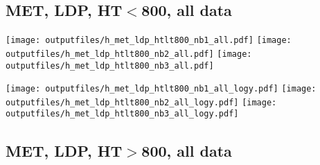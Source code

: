 \documentclass[11pt]{article}
\begin{document}







    \subsection{ MET, LDP, HT$<$800, all data}

    \noindent
     \texttt{[image: outputfiles/h\_met\_ldp\_htlt800\_nb1\_all.pdf]}
     \texttt{[image: outputfiles/h\_met\_ldp\_htlt800\_nb2\_all.pdf]}
     \texttt{[image: outputfiles/h\_met\_ldp\_htlt800\_nb3\_all.pdf]}

    \noindent
     \texttt{[image: outputfiles/h\_met\_ldp\_htlt800\_nb1\_all\_logy.pdf]}
     \texttt{[image: outputfiles/h\_met\_ldp\_htlt800\_nb2\_all\_logy.pdf]}
     \texttt{[image: outputfiles/h\_met\_ldp\_htlt800\_nb3\_all\_logy.pdf]}


    \subsection{ MET, LDP, HT$>$800, all data}
\end{document}
